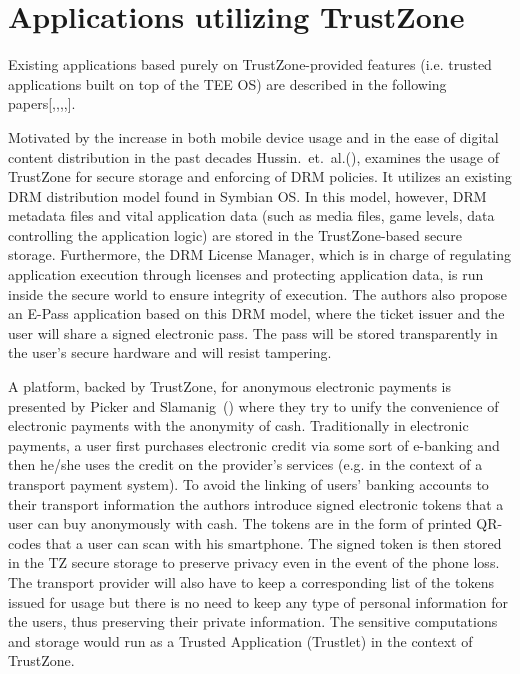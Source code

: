 \documentclass[cameraready]{cseminar}
\begin{document}

\section{Applications utilizing TrustZone}
\label{userapps}

Existing applications based purely on TrustZone-provided features (i.e. trusted applications built on top of the TEE OS) are described in the following papers[\cite{epassdrm},\cite{designembedded},\cite{privacytrustzone},\cite{experimenting},\cite{twofactorauth}].

Motivated by the increase in both mobile device usage and in the ease of digital content distribution in the past decades Hussin.~et.~al.(\cite{epassdrm}), examines the usage of TrustZone for secure storage and enforcing of DRM policies. It utilizes an existing DRM distribution model found in Symbian OS. In this model, however, DRM metadata files and vital application data (such as media files, game levels, data controlling the application logic) are stored in the TrustZone-based secure storage. Furthermore, the DRM License Manager, which is in charge of regulating application execution through licenses and protecting application data, is run inside the secure world to ensure integrity of execution. The authors also propose an E-Pass application based on this DRM model, where the ticket issuer and the user will share a signed electronic pass. The pass will be stored transparently in the user's secure hardware and will resist tampering.
 
A platform, backed by TrustZone, for anonymous electronic payments is presented by Picker and Slamanig~(\cite{privacytrustzone}) where they try to unify the convenience of electronic payments with the anonymity of cash. Traditionally in electronic payments, a user first purchases electronic credit via some sort of e-banking and then he/she uses the credit on the provider's services (e.g. in the context of a transport payment system). To avoid the linking of users' banking accounts to their transport information the authors introduce signed electronic tokens that a user can buy anonymously with cash. The tokens are in the form of printed QR-codes that a user can scan with his smartphone. The signed token is then stored in the TZ secure storage to preserve privacy even in the event of the phone loss. The transport provider will also have to keep a corresponding list of the tokens issued for usage but there is no need to keep any type of personal information for the users, thus preserving their private information. The sensitive computations and storage would run as a Trusted Application (Trustlet) in the context of TrustZone.
\end{document}
